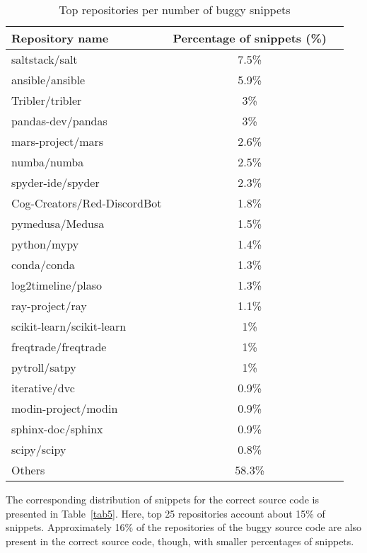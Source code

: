 \documentclass[10pt,conference]{IEEEtran}
\begin{document}
\begin{table}[htbp]
\caption{Top repositories per number of buggy snippets}
\begin{center}
\renewcommand{\arraystretch}{1.2}
\begin{tabular}{| l | c | c |}
\hline
  \textbf{Repository name}  & \textbf{Percentage of snippets (\%)}\\
\hline
  saltstack/salt & 7.5\color{lightgray}\%\\
\hline
  ansible/ansible & 5.9\color{lightgray}\%\\
\hline
  Tribler/tribler  & 3\color{lightgray}\% \\
\hline
  pandas-dev/pandas & 3\color{lightgray}\%\\
\hline
  mars-project/mars & 2.6\color{lightgray}\%\\
\hline
  numba/numba &  2.5\color{lightgray}\%\\
\hline
  spyder-ide/spyder &  2.3\color{lightgray}\%\\
\hline
  Cog-Creators/Red-DiscordBot &  1.8\color{lightgray}\%\\
\hline
  pymedusa/Medusa & 1.5\color{lightgray}\%\\
\hline
  python/mypy &  1.4\color{lightgray}\%\\
\hline
  conda/conda &  1.3\color{lightgray}\%\\
\hline
  log2timeline/plaso & 1.3\color{lightgray}\%\\
\hline
  ray-project/ray &  1.1\color{lightgray}\%\\
\hline
  scikit-learn/scikit-learn &  1\color{lightgray}\%\\
\hline
  freqtrade/freqtrade &  1\color{lightgray}\% \\
\hline
  pytroll/satpy  &  1\color{lightgray}\%\\
\hline
   iterative/dvc &  0.9\color{lightgray}\%\\
\hline
  modin-project/modin &  0.9\color{lightgray}\% \\
\hline
  sphinx-doc/sphinx &  0.9\color{lightgray}\%\\
\hline
  scipy/scipy &  0.8\color{lightgray}\% \\
\hline
  Others &  58.3\color{lightgray}\% \\
\hline
\end{tabular}
\label{tab2}
\end{center}
\end{table}

The corresponding distribution of snippets for the correct source code is presented in Table~\ref{tab5}. Here, top 25 repositories account about 15\% of snippets. 
Approximately 16\%  of the repositories of the buggy source code are also present in the correct source code, though, with smaller percentages of snippets.
\end{document}
